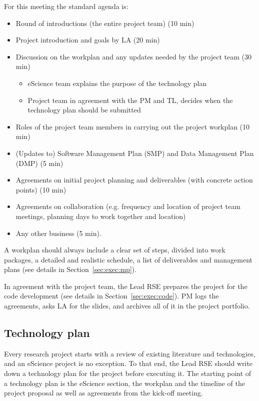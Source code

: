 For this meeting the standard agenda is:
\begin{itemize}
\item Round of introductions (the entire project team) (10 min)
\item Project introduction and goals by LA (20 min)
\item Discussion on the workplan and any updates needed by the project team (30 min)
\begin{itemize}
\item eScience team explains the purpose of the technology plan
\item Project team in agreement with the PM and TL, decides when the technology plan should be submitted
\end{itemize}
\item Roles of the project team members in carrying out the project workplan (10 min)
\item (Updates to) Software Management Plan (SMP) and Data Management Plan (DMP) (5 min)
\item Agreements on initial project planning and deliverables (with concrete action points) (10 min)
\item Agreements on collaboration (e.g. frequency and location of project team meetings, planning days to work together and
location)
\item Any other business (5 min).
\end{itemize}

A workplan should always include a clear set of steps, divided into work packages, a detailed and realistic schedule, a
list of deliverables and management plans (see details in Section~\ref{sec:exec:mp}).

In agreement with the project team, the Lead RSE prepares the project for the code development (see details in Section~\ref{sec:exec:code}). PM logs the agreements, asks LA for the slides, and archives all of it in the project
portfolio.


\subsection{Technology plan}
\label{sec:init:techplan}

Every research project starts with a review of existing literature and technologies, and an eScience project is no exception.
To that end, the Lead RSE should write down a technology plan for the project before executing it. The starting point of 
a technology plan is the eScience section, the workplan and the timeline of the project proposal as well as agreements from the kick-off meeting.

